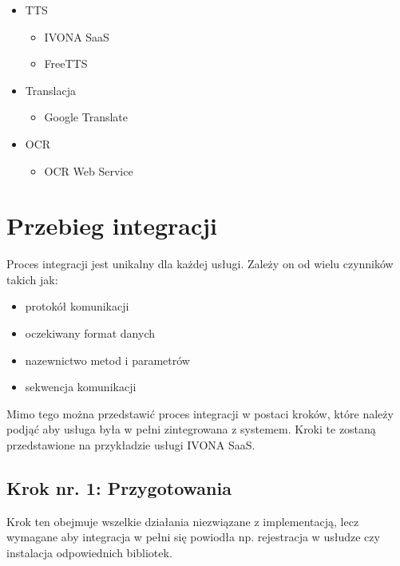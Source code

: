 \begin{itemize}
	\item TTS
	\begin{itemize}
		\item IVONA SaaS
		\item FreeTTS
	\end{itemize}
	\item Translacja
	\begin{itemize}
		\item Google Translate
	\end{itemize}
	\item OCR
	\begin{itemize}
		\item OCR Web Service
	\end{itemize}
\end{itemize}

\section {Przebieg integracji}

Proces integracji jest unikalny dla każdej usługi. Zależy on od wielu czynników takich jak:

\begin{itemize}
	\item protokół komunikacji
	\item oczekiwany format danych
	\item nazewnictwo metod i parametrów
	\item sekwencja komunikacji
\end{itemize}

Mimo tego można przedstawić proces integracji w postaci kroków, które należy podjąć aby usługa była w pełni zintegrowana z systemem. Kroki te zostaną przedstawione na przykładzie usługi IVONA SaaS.

\subsection {Krok nr. 1: Przygotowania}
Krok ten obejmuje wszelkie działania niezwiązane z implementacją, lecz wymagane aby integracja w pełni się powiodła np. rejestracja w usłudze czy instalacja odpowiednich bibliotek.

